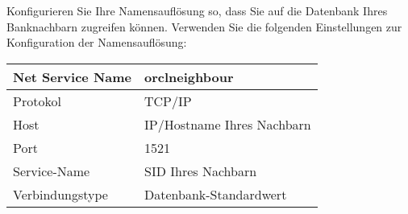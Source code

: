     \item Konfigurieren Sie Ihre Namensaufl\"osung so, dass Sie auf die Datenbank Ihres Banknachbarn zugreifen k\"onnen. Verwenden Sie die folgenden Einstellungen zur Konfiguration der Namensaufl\"osung:

    \tabletail{
      \hline
    }
    \begin{supertabular}{|l|l|}
      \hline
      Net Service Name & orclneighbour\\
      \hline
      Protokol & TCP/IP \\
      \hline
      Host & IP/Hostname Ihres Nachbarn \\
      \hline
      Port & 1521 \\
      \hline
      Service-Name & SID Ihres Nachbarn \\
      \hline
      Verbindungstype & Datenbank-Standardwert\\
    \end{supertabular}
